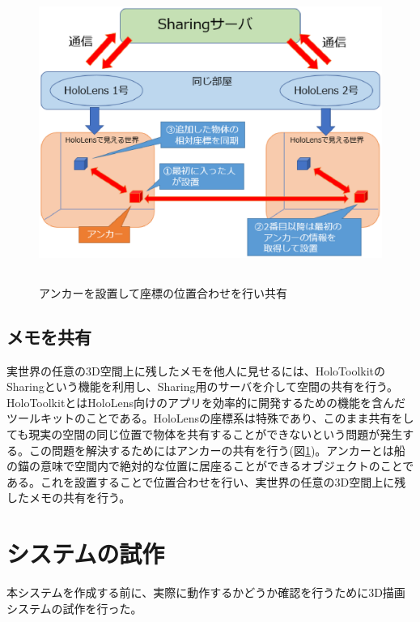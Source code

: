 \documentclass{hissymp}
\begin{document}
\begin{figure}[t]
  \begin{center}
    \includegraphics[clip,height=9.0cm,width=13.0cm]{./sharing.eps}
    \caption{アンカーを設置して座標の位置合わせを行い共有}
    \label{fig:sharing}
  \end{center}
\end{figure}

\subsection{メモを共有}
実世界の任意の3D空間上に残したメモを他人に見せるには、HoloToolkit\cite{tex7}のSharing\cite{tex8}という機能を利用し、Sharing用のサーバを介して空間の共有を行う。HoloToolkitとはHoloLens向けのアプリを効率的に開発するための機能を含んだツールキットのことである。HoloLensの座標系は特殊であり、このまま共有をしても現実の空間の同じ位置で物体を共有することができないという問題が発生する。この問題を解決するためにはアンカーの共有を行う(図\ref{fig:sharing})。アンカーとは船の錨の意味で空間内で絶対的な位置に居座ることができるオブジェクトのことである。これを設置することで位置合わせを行い、実世界の任意の3D空間上に残したメモの共有を行う。

\section{システムの試作}
本システムを作成する前に、実際に動作するかどうか確認を行うために3D描画システムの試作を行った。
\end{document}
